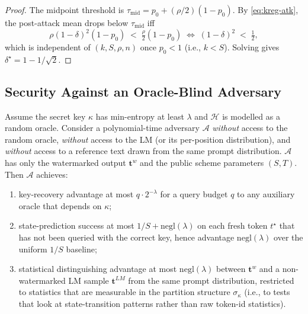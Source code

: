 \begin{proof}
  The midpoint threshold is $\tau_{\mathrm{mid}} = p_0 +
  (\rho/2)(1 - p_0)$.  By \eqref{eq:kreg-atk}, the post-attack mean
  drops below $\tau_{\mathrm{mid}}$ iff
  \[
    \rho (1-\delta)^2 (1 - p_0) \;<\; \tfrac{\rho}{2} (1 - p_0)
    \;\Longleftrightarrow\; (1-\delta)^2 \;<\; \tfrac{1}{2},
  \]
  which is independent of $(k, S, \rho, n)$ once $p_0 < 1$ (i.e.,
  $k < S$).  Solving gives $\delta^\star = 1 - 1/\sqrt{2}$.
\end{proof}

\subsection{Security Against an Oracle-Blind Adversary}
\label{subsec:proof-security}

\begin{theorem}
  \label{thm:security}
  Assume the secret key $\kappa$ has min-entropy at least $\lambda$ and
  $\mathcal{H}$ is modelled as a random oracle.  Consider a
  polynomial-time adversary $\mathcal{A}$ \emph{without} access to
  the random oracle, \emph{without} access to the LM (or its
  per-position distribution), and \emph{without} access to a
  reference text drawn from the same prompt distribution.  $\mathcal{A}$
  has only the watermarked output $\mathbf{t}^w$ and the public
  scheme parameters $(S, T)$.  Then $\mathcal{A}$ achieves:
  \begin{enumerate}[label=(\roman*), leftmargin=1.6em, nosep]
    \item key-recovery advantage at most $q \cdot 2^{-\lambda}$ for a
      query budget $q$ to any auxiliary oracle that depends on $\kappa$;
    \item state-prediction success at most $1/S +
      \mathrm{negl}(\lambda)$ on each fresh token $t^\star$ that has
      not been queried with the correct key, hence advantage
      $\mathrm{negl}(\lambda)$ over the uniform $1/S$ baseline;
    \item statistical distinguishing advantage at most
      $\mathrm{negl}(\lambda)$ between $\mathbf{t}^w$ and a
      non-watermarked LM sample $\mathbf{t}^{LM}$ from the same
      prompt distribution, restricted to statistics that are
      measurable in the partition structure $\sigma_\kappa$ (i.e.,
      to tests that look at state-transition patterns rather than
      raw token-id statistics).
  \end{enumerate}
\end{theorem}

